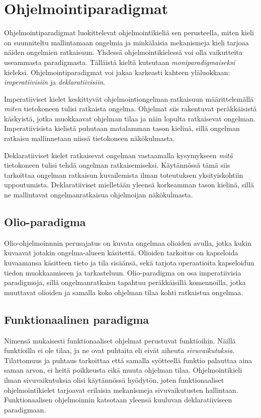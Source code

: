 \chapter{Ohjelmointiparadigmat} \label{Ohjelmointiparadigmat}
Ohjelmointiparadigmat luokittelevat ohjelmointikieliä sen perusteella, miten kieli on suunniteltu mallintamaan ongelmia ja minkälaisia mekanismeja kieli tarjoaa näiden ongelmien ratkaisuun. Yhdessä ohjelmointikielessä voi olla vaikutteita useammasta paradigmasta. Tälläistä kieltä kutsutaan \textit{moniparadigmaiseksi} kieleksi. Ohjelmointiparadigmat voi jakaa karkeasti kahteen yläluokkaan: \textit{imperatiivisiin} ja \textit{deklaratiivisiin}.
\cite[Luku 6]{principlesAndParadigms}

Imperatiiviset kielet keskittyvät ohjelmointiongelman ratkaisuun määrittelemällä \textit{miten} tietokoneen tulisi ratkaista ongelma. Ohjelmat siis rakentuvat peräkkäisistä käskyistä, jotka muokkaavat ohjelman tilaa ja näin lopulta ratkaisevat ongelman. Imperatiivisista kielistä puhutaan matalamman tason kielinä, sillä ongelman ratkaisu mallinnetaan niissä tietokoneen näkökulmasta.
\cite[Luku 1]{programmingLanguagePragmatics} 

Deklaratiiviset kielet ratkaisevat ongelman vastaamalla kysymykseen \textit{mitä} tietokoneen tulisi tehdä ongelman ratkaisemiseksi. Käytännössä tämä siis tarkoittaa ongelman ratkaisun kuvailemista ilman toteutuksen yksityiskohtiin uppoutumista. Deklaratiiviset mielletään yleensä korkeamman tason kielinä, sillä ne mallintavat ongelmanratkaisua ohjelmoijan näkökulmasta.
\cite[Luku 1]{programmingLanguagePragmatics}


\section{Olio-paradigma}
Olio-ohjelmoinnnin perusajatus on kuvata ongelmaa olioiden avulla, jotka kukin kuvaavat jotakin ongelma-alueen käsitettä. Olioiden tarkoitus on kapseloida kuvaamansa käsitteen tieto ja tila sisäänsä, sekä tarjota operaatioita kapseloidun tiedon muokkaamiseen ja tarkasteluun. Olio-paradigma on osa imperatiivisia paradigmoja, sillä ongelmanratkaisu tapahtuu peräkkäisillä komennoilla, jotka muuttavat olioiden ja samalla koko ohjelman tilaa kohti ratkaistua ongelmaa. \cite[Luku 1]{programmingLanguagePragmatics}
\cite[Luku 10]{principlesAndParadigms}


\section{Funktionaalinen paradigma}
Nimensä mukaisesti funktionaaliset ohjelmat perustuvat funktioihin. Näillä funktioilla ei ole tilaa, ja ne ovat puhtaita eli eivät aiheuta \textit{sivuvaikutuksia}. Tilattomuus ja puhtaus tarkoittaa että samalla syötteellä funktio palauttaa aina saman arvon, ei heitä poikkeusta eikä muuta ohjelman tilaa. \cite[Luku 1]{functionalProgrammingInScala} Ohjelmointikieli ilman sivuvaikutuksia olisi käytännössä hyödytön, joten funktionaaliset ohjelmointikielet tarjoavat erilaisia mekanismeja sivuvaikutusten hallintaan.  Funktionaalisen ohjelmoinnin katsotaan yleensä kuuluvan deklaratiiviseen paradigmaan. \cite[Luku 11]{principlesAndParadigms}


